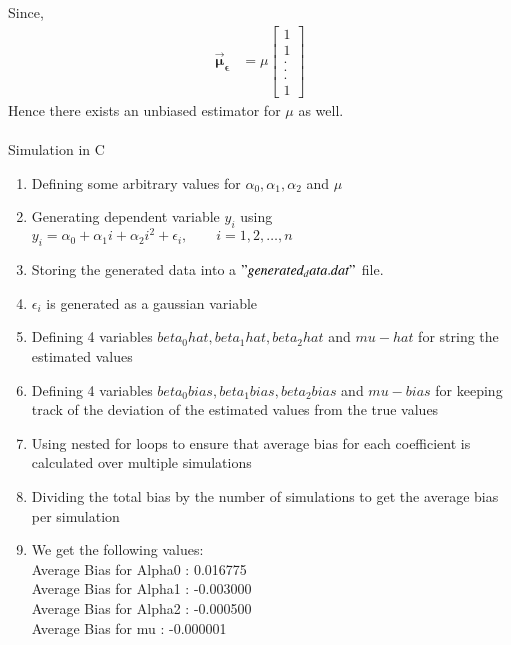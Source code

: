 \documentclass[journal,12pt,onecolumn]{IEEEtran}
\providecommand{\mtx}[1]{\mathbf{#1}}
\theoremstyle{remark}
\begin{document}
Since,
\begin{align}
\vec{\boldsymbol{\mu}}_{\boldsymbol{{\epsilon}}}&=\mu \begin{bmatrix}
1 \\%
1 \\%
. \\[-10pt]
. \\[-10pt]
. \\[5pt]
1
\end{bmatrix}
\end{align}
Hence there exists an unbiased estimator for $\mu$ as well.
\\
\\
Simulation in C
\begin{enumerate}
\item {Defining some arbitrary values for ${\alpha}_0, {\alpha}_1, {\alpha}_2$ and $\mu$}
\item {Generating dependent variable $y_i$ using $y_i={\alpha}_0+{\alpha}_1i+{\alpha}_2i^2+\epsilon_{i}, \qquad i = 1,2,…,n$}
\item {Storing the generated data into a $"generated_data.dat"$ file.}
\item {$\epsilon_{i}$ is generated as a gaussian variable}
\item {Defining 4 variables $beta_0hat, beta_1hat, beta_2hat$ and $mu-hat$ for string the estimated values}
\item {Defining 4 variables $beta_0bias, beta_1bias, beta_2bias$ and $mu-bias$ for keeping track of the deviation of the estimated values from the true values}
\item {Using nested for loops to ensure that average bias for each coefficient is calculated over multiple simulations}
\item {Dividing the total bias by the number of simulations to get the average bias per simulation}
\item {We get the following values:\\
Average Bias for Alpha0 : 0.016775\\
Average Bias for Alpha1 : -0.003000\\
Average Bias for Alpha2 : -0.000500\\
Average Bias for mu : -0.000001\\
}
\end{enumerate}
\end{document}
